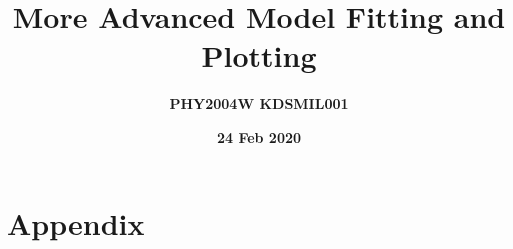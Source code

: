 \documentclass[12pt]{article}
\title{More Advanced Model Fitting and Plotting}
\author{\textbf{PHY2004W \hspace{8cm} KDSMIL001}}
\date{\textbf{24 Feb 2020}}
\begin{document}
    \begin{titlepage}
        \maketitle
        \tableofcontents
    \end{titlepage}

    
    \section{Appendix}
    
    
    
\end{document}
